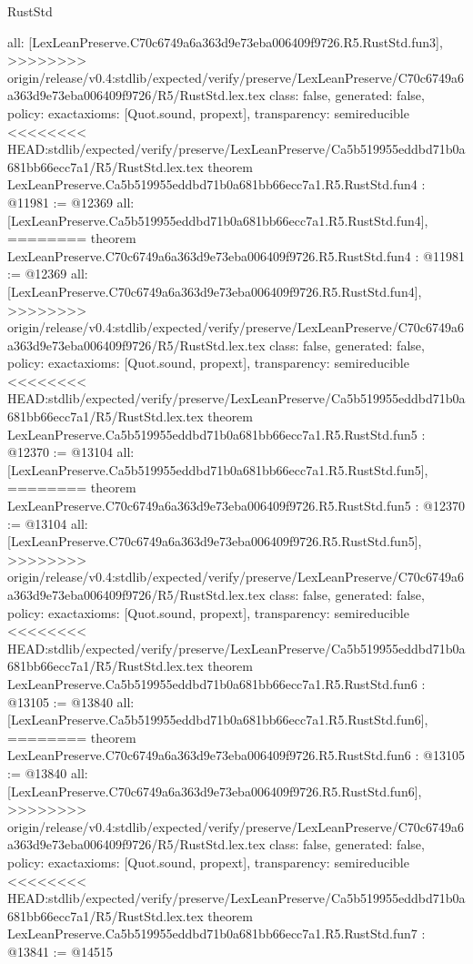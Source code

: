 \begin{lexlean}{RustStd}
\begin{coremodule}
{\begin{coremodule}
{{{{{{{  all: [LexLeanPreserve.C70c6749a6a363d9e73eba006409f9726.R5.RustStd.fun3],
>>>>>>>> origin/release/v0.4:stdlib/expected/verify/preserve/LexLeanPreserve/C70c6749a6a363d9e73eba006409f9726/R5/RustStd.lex.tex
  class: false,
  generated: false,
  policy: exact{axioms: [Quot.sound, propext]},
  transparency: semireducible
}
<<<<<<<< HEAD:stdlib/expected/verify/preserve/LexLeanPreserve/Ca5b519955eddbd71b0a681bb66ecc7a1/R5/RustStd.lex.tex
theorem LexLeanPreserve.Ca5b519955eddbd71b0a681bb66ecc7a1.R5.RustStd.fun4 : @11981 := @12369 {
  all: [LexLeanPreserve.Ca5b519955eddbd71b0a681bb66ecc7a1.R5.RustStd.fun4],
========
theorem LexLeanPreserve.C70c6749a6a363d9e73eba006409f9726.R5.RustStd.fun4 : @11981 := @12369 {
  all: [LexLeanPreserve.C70c6749a6a363d9e73eba006409f9726.R5.RustStd.fun4],
>>>>>>>> origin/release/v0.4:stdlib/expected/verify/preserve/LexLeanPreserve/C70c6749a6a363d9e73eba006409f9726/R5/RustStd.lex.tex
  class: false,
  generated: false,
  policy: exact{axioms: [Quot.sound, propext]},
  transparency: semireducible
}
<<<<<<<< HEAD:stdlib/expected/verify/preserve/LexLeanPreserve/Ca5b519955eddbd71b0a681bb66ecc7a1/R5/RustStd.lex.tex
theorem LexLeanPreserve.Ca5b519955eddbd71b0a681bb66ecc7a1.R5.RustStd.fun5 : @12370 := @13104 {
  all: [LexLeanPreserve.Ca5b519955eddbd71b0a681bb66ecc7a1.R5.RustStd.fun5],
========
theorem LexLeanPreserve.C70c6749a6a363d9e73eba006409f9726.R5.RustStd.fun5 : @12370 := @13104 {
  all: [LexLeanPreserve.C70c6749a6a363d9e73eba006409f9726.R5.RustStd.fun5],
>>>>>>>> origin/release/v0.4:stdlib/expected/verify/preserve/LexLeanPreserve/C70c6749a6a363d9e73eba006409f9726/R5/RustStd.lex.tex
  class: false,
  generated: false,
  policy: exact{axioms: [Quot.sound, propext]},
  transparency: semireducible
}
<<<<<<<< HEAD:stdlib/expected/verify/preserve/LexLeanPreserve/Ca5b519955eddbd71b0a681bb66ecc7a1/R5/RustStd.lex.tex
theorem LexLeanPreserve.Ca5b519955eddbd71b0a681bb66ecc7a1.R5.RustStd.fun6 : @13105 := @13840 {
  all: [LexLeanPreserve.Ca5b519955eddbd71b0a681bb66ecc7a1.R5.RustStd.fun6],
========
theorem LexLeanPreserve.C70c6749a6a363d9e73eba006409f9726.R5.RustStd.fun6 : @13105 := @13840 {
  all: [LexLeanPreserve.C70c6749a6a363d9e73eba006409f9726.R5.RustStd.fun6],
>>>>>>>> origin/release/v0.4:stdlib/expected/verify/preserve/LexLeanPreserve/C70c6749a6a363d9e73eba006409f9726/R5/RustStd.lex.tex
  class: false,
  generated: false,
  policy: exact{axioms: [Quot.sound, propext]},
  transparency: semireducible
}
<<<<<<<< HEAD:stdlib/expected/verify/preserve/LexLeanPreserve/Ca5b519955eddbd71b0a681bb66ecc7a1/R5/RustStd.lex.tex
theorem LexLeanPreserve.Ca5b519955eddbd71b0a681bb66ecc7a1.R5.RustStd.fun7 : @13841 := @14515 {
}}}}}}}}}}
\end{coremodule}}
\end{coremodule}
\end{lexlean}
